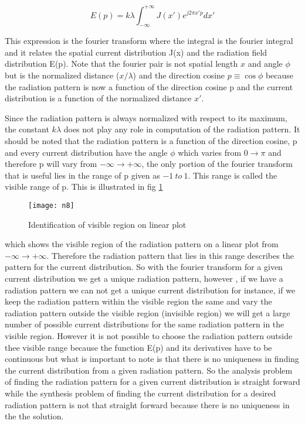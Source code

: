 \begin{equation}
E(p) = k\lambda\int_{-\infty}^{+\infty}J(x') e^{j2\pi x' p}dx'
\label{eqn30}	
\end{equation}

This expression is the fourier transform where  the integral is the fourier integral and it relates the spatial current distribution J(x) and the radiation field distribution E(p). Note that the fourier pair is not spatial length $x$ and angle  $\phi$ but is the normalized distance  ($x/\lambda$) and the direction cosine $ p \equiv \cos\phi$ because the radiation pattern is now a function of the direction cosine p and the current distribution is a function of the normalized distance $x'$.

Since the radiation pattern is always normalized with respect to its maximum, the constant $k\lambda$ does not play any role in computation of the radiation pattern. It should be noted that the radiation pattern is a function of the direction cosine, p and every current distribution have the angle $\phi$ which varies from $0\to\pi$ and therefore p will vary from $-\infty\to +\infty$, the only portion of the fourier transform that is useful lies in the range of p given as $-1 \ to\ 1$. This range is called the visible range of p. This is illustrated in fig \ref{fig:8}
\begin{figure}[h]
	\centering
	\texttt{[image: n8]}
	\caption{Identification of visible region on linear plot}
	\label{fig:8}
\end{figure}
which shows the visible region of the radiation pattern on a linear plot from $-\infty\to +\infty$. Therefore the radiation pattern that lies in this range describes the pattern for the current distribution. So with the fourier transform for a given current distribution we get a unique radiation pattern, however , if we have a radiation pattern we can not get a unique current distribution for instance, if we keep the radiation pattern within the visible region the same and vary the radiation pattern outside the visible region (invisible region) we will get a large number of possible current distributions for the same radiation pattern in the visible region. However it is not possible to choose the radiation pattern outside thee visible range because the function E(p) and its derivatives have to be continuous but what is important to note is that there is no uniqueness in finding the current distribution from a given radiation pattern. So the analysis problem of finding the radiation pattern for a given current distribution is straight forward while the synthesis problem of finding the current distribution for  a desired radiation pattern is not that straight forward because there is no uniqueness in the the solution.

